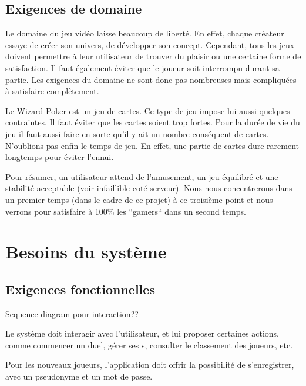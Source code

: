 \documentclass[11pt,a4paper]{article}
\begin{document}
\subsection{Exigences de domaine}
\label{sec:exi-dom}

Le domaine du jeu vidéo laisse beaucoup de liberté.  En effet, chaque créateur essaye de créer son univers, de développer son concept.  Cependant, tous les jeux doivent permettre à leur utilisateur de trouver du plaisir ou une certaine forme de satisfaction.  Il faut également éviter que le joueur soit interrompu durant sa partie.  Les exigences du domaine ne sont donc pas nombreuses mais compliquées à satisfaire complètement.

Le Wizard Poker est un jeu de cartes.  Ce type de jeu impose lui aussi quelques contraintes.  Il faut éviter que les cartes soient trop fortes.  Pour la durée de vie du jeu il faut aussi faire en sorte qu'il y ait un nombre conséquent de cartes.  N'oublions pas enfin le temps de jeu.  En effet, une partie de cartes dure rarement longtemps pour éviter l'ennui.

Pour résumer, un utilisateur attend de l'amusement, un jeu équilibré et une stabilité acceptable (voir infaillible coté serveur).  Nous nous concentrerons dans un premier temps (dans le cadre de ce projet) à ce troisième point et nous verrons pour satisfaire à 100\% les ``gamers`` dans un second temps.



\section{Besoins du système}
\label{sec:besoins-sys}

\subsection{Exigences fonctionnelles}
\label{sec:exi-fonc-sys}


Sequence diagram pour interaction??

Le système doit interagir avec l'utilisateur, et lui proposer
certaines actions, comme commencer un duel, gérer ses s,
consulter le classement des joueurs, etc.

Pour les nouveaux joueurs, l'application doit offrir la possibilité de
s'enregistrer, avec un pseudonyme et un mot de passe.
\end{document}
